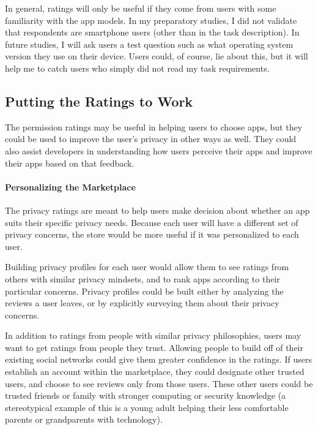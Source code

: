 \documentclass[11pt]{article}
\begin{document}
In general, ratings will only be useful if they come from users with some
familiarity with the app models.
In my preparatory studies, I did not validate that respondents are
smartphone users (other than in the task description). In future
studies, I will ask users a test question such as what operating
system version they use on their device. Users could, of course, lie
about this, but it will help me to catch users who simply did not read
my task requirements.

\subsection{Putting the Ratings to Work}
\label{subsec-app-selection}

The permission ratings may be useful in helping users to choose apps, but
they could be used to improve the user's privacy in other ways as well. They could
also assist developers in understanding how users perceive their apps 
and improve their apps based on that feedback.

\paragraph{Personalizing the Marketplace}
\label{subsubsec-personalizing}

The privacy ratings are meant to help users make decision about whether
an app suits their specific privacy needs. Because each user will have a different
set of privacy concerns, the store would be more useful if it was personalized
to each user.

Building privacy profiles for each user would allow them to see ratings from
others with similar privacy mindsets, and to rank apps according to their
particular concerns. Privacy profiles could be built either by 
analyzing the reviews a user leaves, or by explicitly surveying them about their
privacy concerns. 

In addition to ratings from people with similar privacy philosophies, users may want to get
ratings from people they trust. Allowing people to build off of their existing 
social networks could give them greater confidence in the ratings. If users 
establish an account within the marketplace, they could designate other trusted
users, and choose to see reviews only from those users.
These other users could be trusted friends or family with stronger
computing or security knowledge (a stereotypical example of this is a
young adult helping their less comfortable parents or grandparents with technology).
\end{document}
